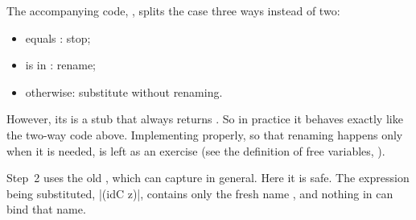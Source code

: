 The accompanying code, , splits the  case three ways instead of two:
\begin{itemize}
  \item {} equals : stop;
  \item {} is  in : rename;
  \item otherwise: substitute without renaming.
\end{itemize}
However, its  is a stub that always returns . So in practice it behaves exactly like the two-way code above. Implementing  properly, so that renaming happens only when it is needed, is left as an exercise (see the definition of free variables, ).

\begin{remark}
Step~2 uses the old , which can capture in general. Here it is safe. The expression being substituted, \rkt|(idC z)|, contains only the fresh name , and nothing in  can bind that name.
\end{remark}
